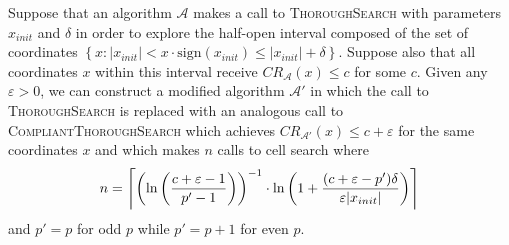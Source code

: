 \begin{lemma} 
  Suppose that an algorithm $\mathcal{A}$ makes a call to \textsc{ThoroughSearch} with parameters $x_{init}$ and $\delta$ in order to explore the half-open interval composed of the set of coordinates $\left\{x : |x_{init}|<x\cdot\text{sign}\left(x_{init}\right)\leq |x_{init}|+\delta\right\}$. Suppose also that all coordinates $x$ within this interval receive $CR_{\mathcal{A}}(x)\leq c$ for some $c$. Given any $\varepsilon>0$, we can construct a modified algorithm $\mathcal{A}'$ in which the call to \textsc{ThoroughSearch} is replaced with an analogous call to \textsc{CompliantThoroughSearch} which achieves $CR_{\mathcal{A}'}(x)\leq c+\varepsilon$ for the same coordinates $x$ and which makes $n$ calls to cell search where
  \begin{equation*}
    n = \ceil*{\left(\ln\left(\frac{c+\varepsilon-1}{p'-1}\right)\right)^{-1}\cdot\ln\left(1+\frac{(c+\varepsilon-p')\delta}{\varepsilon |x_{init}|}\right)}
  \end{equation*}
  and $p'=p$ for odd $p$ while $p'=p+1$ for even $p$.
\end{lemma}
